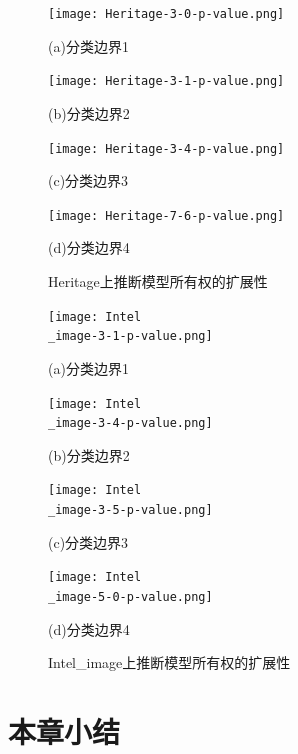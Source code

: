 \begin{figure}[htbp]%
	\centering
	\begin{minipage}[htbp]{0.49\linewidth}        %
		\hspace{2mm}
		\centering
		\texttt{[image: Heritage-3-0-p-value.png]}
		\centerline{(a)分类边界1}
	\end{minipage}
	\begin{minipage}[htbp]{0.49\linewidth}        %
		\hspace{2mm}
		\centering
		\texttt{[image: Heritage-3-1-p-value.png]}
		\centerline{(b)分类边界2}
	\end{minipage}
	\begin{minipage}[htbp]{0.49\linewidth}        %
		\hspace{2mm}
		\centering
		\texttt{[image: Heritage-3-4-p-value.png]}
		\centerline{(c)分类边界3}
	\end{minipage}
	\begin{minipage}[htbp]{0.49\linewidth}        %
		\hspace{2mm}
		\centering
		\texttt{[image: Heritage-7-6-p-value.png]}
		\centerline{(d)分类边界4}
	\end{minipage}
\setlength{\abovecaptionskip}{7mm} %
\caption{Heritage上推断模型所有权的扩展性}
\label{Heritage上推断模型所有权的扩展性}
\end {figure}
		
\begin{figure}[htbp]%
	\centering
	\begin{minipage}[htbp]{0.49\linewidth}        %
		\hspace{2mm}
		\centering
		\texttt{[image: Intel\\\_image-3-1-p-value.png]}
		\centerline{(a)分类边界1}
	\end{minipage}
	\begin{minipage}[htbp]{0.49\linewidth}        %
		\hspace{2mm}
		\centering
		\texttt{[image: Intel\\\_image-3-4-p-value.png]}
		\centerline{(b)分类边界2}
	\end{minipage}
	\begin{minipage}[htbp]{0.49\linewidth}        %
		\hspace{2mm}
		\centering
		\texttt{[image: Intel\\\_image-3-5-p-value.png]}
		\centerline{(c)分类边界3}
	\end{minipage}
	\begin{minipage}[htbp]{0.49\linewidth}        %
		\hspace{2mm}
		\centering
		\texttt{[image: Intel\\\_image-5-0-p-value.png]}
		\centerline{(d)分类边界4}
	\end{minipage}
\setlength{\abovecaptionskip}{7mm} %
\caption{Intel\_image上推断模型所有权的扩展性}
\label{Intel-image上推断模型所有权的扩展性}
\end {figure}


\section{本章小结}